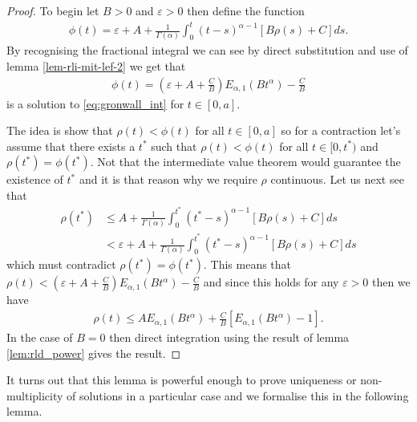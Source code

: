 \begin{proof}
	To begin let $ B > 0 $ and $ \varepsilon > 0 $ then define the function
	\begin{align}
		\label{eq:gronwall_int}
		\phi(t) = \varepsilon +  A + \frac{1}{\Gamma(\alpha)} \int_0^t (t-s)^{\alpha-1}[ B \rho(s) + C] ds.
	\end{align}
	By recognising the fractional integral we can see by direct substitution and use of lemma \ref{lem-rli-mit-lef-2} we get that
	\begin{align*}
		\phi(t) = \left( \varepsilon + A + \frac{C}{B} \right)E_{\alpha,1}(B t^\alpha) - \frac{C}{B}
	\end{align*}
	is a solution to \eqref{eq:gronwall_int} for $ t \in [0, a] $.
	
	The idea is show that $ \rho(t) < \phi(t) $ for all $ t \in [0,a] $ so  for a contraction let's assume that there exists a $ t^* $ such that $ \rho(t) < \phi(t) $ for all $ t \in [0, t^*) $ and $ \rho(t^*) = \phi(t^*) $. Not that the intermediate value theorem would guarantee the existence of $ t^* $ and it is that reason why we require $ \rho $ continuous. 
	Let us next see that 
	\begin{align*}
		\rho(t^*) &\leq A + \frac{1}{\Gamma(\alpha)} \int_0^{t^*} (t^* - s)^{\alpha - 1}[B \rho(s) + C] ds \\
		&< \varepsilon + A + \frac{1}{\Gamma(\alpha)} \int_0^{t^*} (t^* - s)^{\alpha - 1}[B \rho(s) + C] ds
	\end{align*}
	which must contradict $ \rho(t^*) = \phi(t^*) $.
	This means that $ \rho(t) < \left( \varepsilon + A + \frac{C}{B}\right) E_{\alpha,1}(Bt^\alpha) - \frac{C}{B} $ and since this holds for any $ \varepsilon > 0 $ then we have
	\begin{align*}
		\rho(t) \leq AE_{\alpha,1}(B t^\alpha) + \frac{C}{B}[E_{\alpha, 1}(Bt^\alpha) - 1].
	\end{align*}
	In the case of $ B = 0 $ then direct integration using the result of lemma \ref{lem:rld_power} gives the result.
\end{proof}

It turns out that this lemma is powerful enough to prove uniqueness or non-multiplicity of solutions in a particular case and we formalise this in the following lemma.

